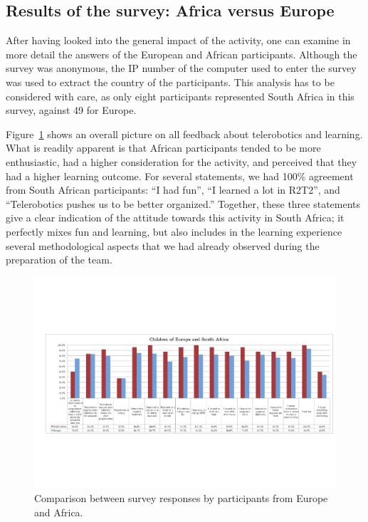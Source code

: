 \documentclass{intech-journal}
\begin{document}
\subsection{Results of the survey: Africa versus Europe}

After having looked into the general impact of the activity, one can examine in more detail the answers of the European and African participants. 
Although the survey was anonymous, the IP number of the computer used to enter the survey was used to extract the country of the participants.
This analysis has to be considered with care, as only eight participants represented South Africa in this survey, against 49 for Europe.


Figure~\ref{fig:EU-SA} shows an overall picture on all feedback about telerobotics and learning.
What is readily apparent is that African participants tended to be more enthusiastic, had a higher consideration for the activity, and perceived that they had a higher learning outcome. 
For several statements, we had 100\% agreement from South African participants: ``I had fun'', ``I learned a lot in R2T2'', and ``Telerobotics pushes us to be better organized.''
Together, these three statements give a clear indication of the attitude towards this activity in South Africa; it perfectly mixes fun and learning, but also includes in the learning experience several methodological aspects that we had already observed during the preparation of the team. 

\begin{figure}[ht]
 \centering
    \includegraphics[width=\columnwidth]{figures/all-eu-sa.pdf}
  \caption{Comparison between survey responses by participants from Europe and Africa.}
  \label{fig:EU-SA} 
\end{figure}
\end{document}
